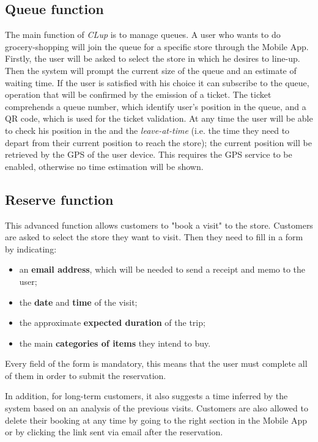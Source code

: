 \subsection{Queue function}
The main function of \textit{CLup} is to manage queues. A user who wants to do grocery-shopping will join the queue for a specific store through the Mobile App.\newline
Firstly, the user will be asked to select the store in which he desires to line-up.\newline
Then the system will prompt the current size of the queue and an estimate of waiting time. If the user is satisfied with his choice it can subscribe to the queue, operation that will be confirmed by the emission of a ticket. The ticket comprehends a queue number, which identify user's position in the queue, and a QR code, which is used for the ticket validation. At any time the user will be able to check his position in the and the \textit{leave-at-time} (i.e. the time they need to depart from their current position to reach the store); the current position will be retrieved by the GPS of the user device. This requires the GPS service to be enabled, otherwise no time estimation will be shown.

\subsection{Reserve function}
This advanced function allows customers to "book a visit" to the store. Customers are asked to select the store they want to visit. Then they need to fill in a form by indicating:
\begin{itemize}
	\item an \textbf{email address}, which will be needed to send a receipt and memo to the user;
	\item the \textbf{date} and \textbf{time} of the visit;
	\item the approximate \textbf{expected duration} of the trip;
 	\item the main \textbf{categories of items} they intend to buy.
\end{itemize}
Every field of the form is mandatory, this means that the user must complete all of them in order to submit the reservation. %

In addition, for long-term customers, it also suggests a time inferred by the system based on an analysis of the previous visits.
Customers are also allowed to delete their booking at any time by going to the right section in the Mobile App or by clicking the link sent via email after the reservation. 

